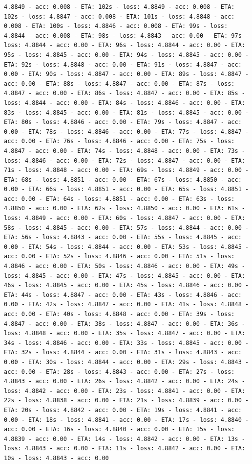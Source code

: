 \documentclass[11pt]{article}
\begin{document}
\begin{Verbatim}[commandchars=\\\{\}]
4.8849 - acc: 0.008 - ETA: 102s - loss: 4.8849 - acc: 0.008 - ETA: 102s - loss: 4.8847 - acc: 0.008 - ETA: 101s - loss: 4.8848 - acc: 0.008 - ETA: 100s - loss: 4.8846 - acc: 0.008 - ETA: 99s - loss: 4.8844 - acc: 0.008 - ETA: 98s - loss: 4.8843 - acc: 0.00 - ETA: 97s - loss: 4.8844 - acc: 0.00 - ETA: 96s - loss: 4.8844 - acc: 0.00 - ETA: 95s - loss: 4.8845 - acc: 0.00 - ETA: 94s - loss: 4.8845 - acc: 0.00 - ETA: 92s - loss: 4.8848 - acc: 0.00 - ETA: 91s - loss: 4.8847 - acc: 0.00 - ETA: 90s - loss: 4.8847 - acc: 0.00 - ETA: 89s - loss: 4.8847 - acc: 0.00 - ETA: 88s - loss: 4.8847 - acc: 0.00 - ETA: 87s - loss: 4.8847 - acc: 0.00 - ETA: 86s - loss: 4.8847 - acc: 0.00 - ETA: 85s - loss: 4.8844 - acc: 0.00 - ETA: 84s - loss: 4.8846 - acc: 0.00 - ETA: 83s - loss: 4.8845 - acc: 0.00 - ETA: 81s - loss: 4.8845 - acc: 0.00 - ETA: 80s - loss: 4.8846 - acc: 0.00 - ETA: 79s - loss: 4.8847 - acc: 0.00 - ETA: 78s - loss: 4.8846 - acc: 0.00 - ETA: 77s - loss: 4.8847 - acc: 0.00 - ETA: 76s - loss: 4.8846 - acc: 0.00 - ETA: 75s - loss: 4.8847 - acc: 0.00 - ETA: 74s - loss: 4.8848 - acc: 0.00 - ETA: 73s - loss: 4.8846 - acc: 0.00 - ETA: 72s - loss: 4.8847 - acc: 0.00 - ETA: 71s - loss: 4.8848 - acc: 0.00 - ETA: 69s - loss: 4.8849 - acc: 0.00 - ETA: 68s - loss: 4.8851 - acc: 0.00 - ETA: 67s - loss: 4.8850 - acc: 0.00 - ETA: 66s - loss: 4.8851 - acc: 0.00 - ETA: 65s - loss: 4.8851 - acc: 0.00 - ETA: 64s - loss: 4.8851 - acc: 0.00 - ETA: 63s - loss: 4.8850 - acc: 0.00 - ETA: 62s - loss: 4.8850 - acc: 0.00 - ETA: 61s - loss: 4.8849 - acc: 0.00 - ETA: 60s - loss: 4.8847 - acc: 0.00 - ETA: 58s - loss: 4.8845 - acc: 0.00 - ETA: 57s - loss: 4.8844 - acc: 0.00 - ETA: 56s - loss: 4.8843 - acc: 0.00 - ETA: 55s - loss: 4.8845 - acc: 0.00 - ETA: 54s - loss: 4.8844 - acc: 0.00 - ETA: 53s - loss: 4.8845 - acc: 0.00 - ETA: 52s - loss: 4.8846 - acc: 0.00 - ETA: 51s - loss: 4.8846 - acc: 0.00 - ETA: 50s - loss: 4.8846 - acc: 0.00 - ETA: 49s - loss: 4.8845 - acc: 0.00 - ETA: 47s - loss: 4.8845 - acc: 0.00 - ETA: 46s - loss: 4.8845 - acc: 0.00 - ETA: 45s - loss: 4.8846 - acc: 0.00 - ETA: 44s - loss: 4.8847 - acc: 0.00 - ETA: 43s - loss: 4.8846 - acc: 0.00 - ETA: 42s - loss: 4.8847 - acc: 0.00 - ETA: 41s - loss: 4.8848 - acc: 0.00 - ETA: 40s - loss: 4.8848 - acc: 0.00 - ETA: 39s - loss: 4.8847 - acc: 0.00 - ETA: 38s - loss: 4.8847 - acc: 0.00 - ETA: 36s - loss: 4.8848 - acc: 0.00 - ETA: 35s - loss: 4.8847 - acc: 0.00 - ETA: 34s - loss: 4.8846 - acc: 0.00 - ETA: 33s - loss: 4.8845 - acc: 0.00 - ETA: 32s - loss: 4.8844 - acc: 0.00 - ETA: 31s - loss: 4.8843 - acc: 0.00 - ETA: 30s - loss: 4.8844 - acc: 0.00 - ETA: 29s - loss: 4.8843 - acc: 0.00 - ETA: 28s - loss: 4.8843 - acc: 0.00 - ETA: 27s - loss: 4.8843 - acc: 0.00 - ETA: 26s - loss: 4.8842 - acc: 0.00 - ETA: 24s - loss: 4.8842 - acc: 0.00 - ETA: 23s - loss: 4.8841 - acc: 0.00 - ETA: 22s - loss: 4.8838 - acc: 0.00 - ETA: 21s - loss: 4.8839 - acc: 0.00 - ETA: 20s - loss: 4.8842 - acc: 0.00 - ETA: 19s - loss: 4.8841 - acc: 0.00 - ETA: 18s - loss: 4.8841 - acc: 0.00 - ETA: 17s - loss: 4.8840 - acc: 0.00 - ETA: 16s - loss: 4.8840 - acc: 0.00 - ETA: 15s - loss: 4.8839 - acc: 0.00 - ETA: 14s - loss: 4.8842 - acc: 0.00 - ETA: 13s - loss: 4.8843 - acc: 0.00 - ETA: 11s - loss: 4.8842 - acc: 0.00 - ETA: 10s - loss: 4.8843 - acc: 0.00 
\end{Verbatim}
\end{document}
